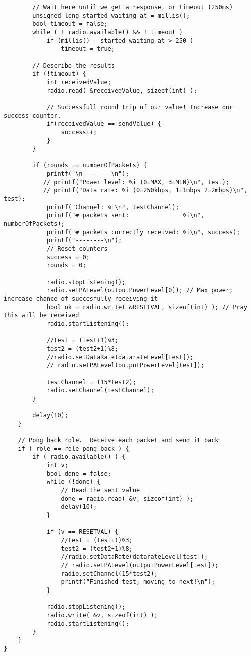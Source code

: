 \begin{lstlisting}
        // Wait here until we get a response, or timeout (250ms)
        unsigned long started_waiting_at = millis();
        bool timeout = false;
        while ( ! radio.available() && ! timeout )
            if (millis() - started_waiting_at > 250 )
                timeout = true;

        // Describe the results
        if (!timeout) {
            int receivedValue;
            radio.read( &receivedValue, sizeof(int) );

            // Successfull round trip of our value! Increase our success counter.
            if(receivedValue == sendValue) {
                success++;
            }
        }

        if (rounds == numberOfPackets) {
            printf("\n--------\n");
           // printf("Power level: %i (0=MAX, 3=MIN)\n", test);
           // printf("Data rate: %i (0=250kbps, 1=1mbps 2=2mbps)\n", test);
            printf("Channel: %i\n", testChannel);
            printf("# packets sent:               %i\n", numberOfPackets);
            printf("# packets correctly received: %i\n", success);
            printf("--------\n");
            // Reset counters
            success = 0;
            rounds = 0;

            radio.stopListening();
            radio.setPALevel(outputPowerLevel[0]); // Max power; increase chance of succesfully receiving it
            bool ok = radio.write( &RESETVAL, sizeof(int) ); // Pray this will be received
            radio.startListening();

            //test = (test+1)%3;
            test2 = (test2+1)%8; 
            //radio.setDataRate(datarateLevel[test]);
            // radio.setPALevel(outputPowerLevel[test]);
            
            testChannel = (15*test2);
            radio.setChannel(testChannel);
        }

        delay(10);
    }

    // Pong back role.  Receive each packet and send it back
    if ( role == role_pong_back ) {
        if ( radio.available() ) {
            int v;
            bool done = false;
            while (!done) {
                // Read the sent value
                done = radio.read( &v, sizeof(int) );
                delay(10);
            }

            if (v == RESETVAL) {
                //test = (test+1)%3;
                test2 = (test2+1)%8;
                //radio.setDataRate(datarateLevel[test]);
                // radio.setPALevel(outputPowerLevel[test]);
                radio.setChannel(15*test2);
                printf("Finished test; moving to next!\n");
            }

            radio.stopListening();
            radio.write( &v, sizeof(int) );
            radio.startListening();
        }
    }
}
\end{lstlisting}